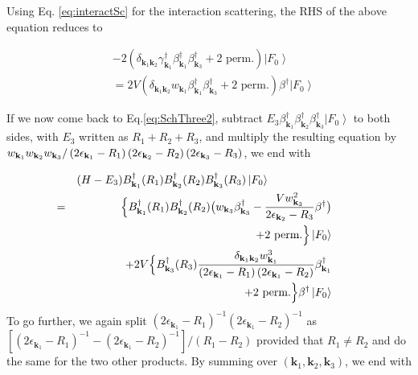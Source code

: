 \documentclass[aps,prb,superscriptaddress,showpacs,reprint,lengthcheck]{revtex4-1}
\begin{document}
Using Eq. \eqref{eq:interactSc} for the interaction scattering, the RHS of the above equation reduces to 

\begin{align*}
  &-2(\delta_{\mathbf{k} _1\mathbf{k} _2}\gamma^{\dagger}_{\mathbf{k} _1}\beta^{\dagger}_{\mathbf{k} _1}\beta^{\dagger}_{\mathbf{k} _3}+ \text{2 perm.})\left|F_0\right>\\
&= 2V(\delta_{\mathbf{k} _1\mathbf{k} _2}w_{\mathbf{k} _1}\beta^{\dagger}_{\mathbf{k} _1}\beta^{\dagger}_{\mathbf{k} _3}+ \text{2 perm.})\beta^{\dagger}\left|F_0\right>
\end{align*}




If we now come back to Eq.\eqref{eq:SchThree2}, subtract $E
_3\beta^{\dagger}_{\mathbf{k} _1}\beta^{\dagger}_{\mathbf{k}
_2}\beta^{\dagger}_{\mathbf{k} _3}\left|F_0\right>  $ to both sides, with $%
E _3$ written as $R_1+R_2+R_3$, and multiply the resulting equation
by $w_{\mathbf{k} _1}w_{\mathbf{k} _2}w_{\mathbf{k} _3}/\left(2\epsilon_{%
\mathbf{k} _1}-R_1\right) \left(2\epsilon_{\mathbf{k} _2}-R_2\right)
\left(2\epsilon_{\mathbf{k} _3}-R_3\right) $, we end with

\begin{eqnarray}  \label{eq:SchThree3}
&&(H-E _3)B^{\dagger}_{\mathbf{k} _1}(R_1)B^{\dagger}_{\mathbf{k}
_2}(R_2)B^{\dagger}_{\mathbf{k} _3}(R_3)\left|F_0\right>  \hspace{3cm}\nonumber\\
&=& \Bigl\{B^{\dagger}_{\mathbf{k} _1}(R_1)B^{\dagger}_{\mathbf{k}
_2}(R_2)\bigl(w_{\mathbf{k} _3}\beta^{\dagger}_{\mathbf{k} _3}-\frac{Vw_{%
\mathbf{k} _3}^2}{2\epsilon_{\mathbf{k} _2}-R_3}\beta^{\dagger}\bigr) \hspace{1cm}\nonumber\\
&&+\text{2 perm.} \Bigr\}\left|F_0\right> \hspace{1cm}\nonumber\\
&&+2V\Bigl\{B^{\dagger}_{\mathbf{k} _3}(R_3)\frac{\delta_{\mathbf{k} _1\mathbf{%
k} _2}w^3_{\mathbf{k} _1}}{\left(2\epsilon_{\mathbf{k} _1}-R_1\right)
\left(2\epsilon_{\mathbf{k} _1}-R_2\right) }\beta^{\dagger}_{\mathbf{k} _1}\hspace{1cm}\nonumber\\
&&\qquad+\text{2 perm.}\Bigr\} 
\beta^{\dagger}\left|F_0\right> \hspace{1cm} 
\end{eqnarray}
To go further, we again split $\left(2\epsilon_{\mathbf{k} _1}-R_1\right)
^{-1}\left(2\epsilon_{\mathbf{k} _1}-R_2\right) ^{-1}$ as $\left[%
\left(2\epsilon_{\mathbf{k} _1}-R_1\right) ^{-1}-\left(2\epsilon_{\mathbf{k}
_1}-R_2\right) ^{-1}\right] /\left(R_1-R_2\right) $ provided that $R_1\neq{}%
R_2$ and do the same for the two other products. By summing over $%
\left(\mathbf{k} _1,\mathbf{k} _2,\mathbf{k} _3\right) $, we end with
\end{document}
